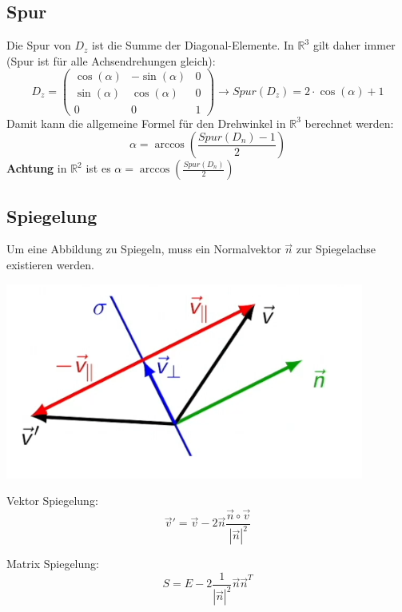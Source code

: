 \subsection{Spur}\label{drehwinkel}
Die Spur von $D_z$ ist die Summe der Diagonal-Elemente. In $\mathbb{R}^3$ gilt daher immer (Spur ist für alle Achsendrehungen gleich):
\[
	D_z = \begin{pmatrix}
		\cos(\alpha) & -\sin(\alpha) & 0 \\
		\sin(\alpha) & \cos(\alpha) & 0 \\
		0 & 0 & 1
	\end{pmatrix} \rightarrow  Spur(D_z) = 2 \cdot \cos(\alpha) + 1 
\]
\noindent Damit kann die allgemeine Formel für den Drehwinkel in $\mathbb{R}^3$ berechnet werden:
\[\alpha = \arccos\left(\frac{Spur(D_n) - 1}{2}\right)\]
\textbf{Achtung} in $\mathbb{R}^2$ ist es $\alpha = \arccos\left(\frac{Spur(D_n)}{2}\right)$

\subsection{Spiegelung}
Um eine Abbildung zu Spiegeln, muss ein Normalvektor $\vec{n}$ zur Spiegelachse existieren werden.

\begin{center}
	\begin{minipage}{0.25\textwidth}
		\includegraphics[width=\linewidth,keepaspectratio=true]{./Images/Spiegelung.png}
	\end{minipage}%
	\begin{minipage}{0.2\textwidth}
		Vektor Spiegelung:
		\[\vec{v}' = \vec{v} - 2\vec{n}\frac{\vec{n} \circ \vec{v}}{|\vec{n}|^2}\]

		Matrix Spiegelung:
		\[S = E - 2\frac{1}{|\vec{n}|^2}\vec{n}\vec{n}^T\]
	\end{minipage}
\end{center}

